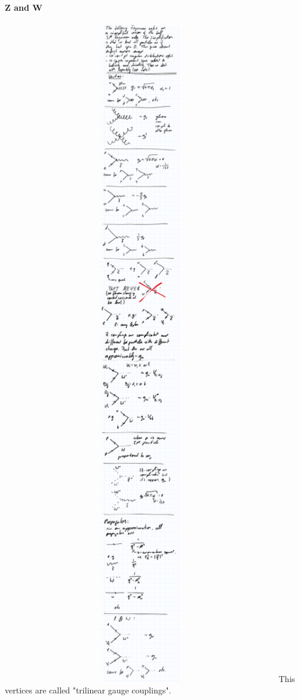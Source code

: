 \paragraph{Z and W\\}
\includegraphics[width=0.9\textwidth]{fig/summary/F_trilinearGauge}
This vertices are called "trilinear gauge couplings".

